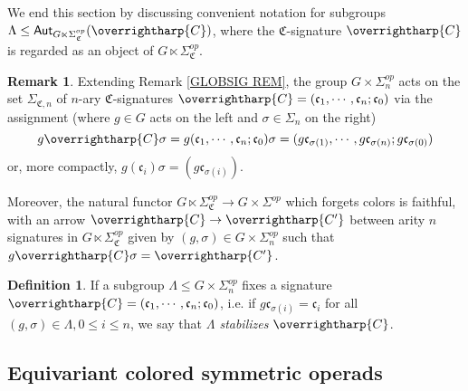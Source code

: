 \documentclass[a4paper,10pt
,draft
]{article}%
\numberwithin{equation}{section}
\numberwithin{figure}{section}
\theoremstyle{definition} %
\newtheorem{definition}[equation]{Definition}%
\newtheorem{remark}[equation]{Remark}%
\newcommand{\vect}[1]{\text{\overrightharp{\ensuremath{#1}}}}
\newcommand{\1}{\ensuremath{\mathbbm 1}}%
\begin{document}
We end this section by discussing convenient notation  
for subgroups 
$\Lambda \leq \mathsf{Aut}_{G \ltimes \Sigma_{\mathfrak{C}}^{op}}(\vect{C})$,
where the $\mathfrak{C}$-signature $\vect{C}$
is regarded as an object of 
$G \ltimes \Sigma_{\mathfrak{C}}^{op}$.



\begin{remark}\label{SIGACT REM}
	Extending Remark \ref{GLOBSIG REM}, 
	the group $G \times \Sigma_n^{op}$
	acts on the set $\Sigma_{\mathfrak{C},n}$
	of $n$-ary $\mathfrak{C}$-signatures
	$\vect{C} = (\mathfrak{c}_1,\cdots,\mathfrak{c}_n;\mathfrak{c}_0)$
	via the assignment (where $g \in G$ acts on the left and $\sigma \in \Sigma_n$ on the right)
	\begin{equation}\label{SIGACT_EQ}
	g \vect{C} \sigma =
	g (\mathfrak{c}_1,\cdots,\mathfrak{c}_n;\mathfrak{c}_0) \sigma
	=
	(g\mathfrak{c}_{\sigma(1)},\cdots,g\mathfrak{c}_{\sigma(n)};g\mathfrak{c}_{\sigma(0)})
	\end{equation}
	or, more compactly, $g (\mathfrak{c}_i) \sigma = (g \mathfrak{c}_{\sigma(i)})$.
	
	Moreover, the natural functor 
	$G \ltimes \Sigma^{op}_{\mathfrak{C}}
	\to G \times \Sigma^{op}$
	which forgets colors is faithful,
	with an arrow
	$\vect{C} \to \vect{C'}$
	between arity $n$ signatures
	in $G \ltimes \Sigma_{\mathfrak{C}}^{op}$
	given by 
	$(g,\sigma) \in G \times \Sigma_n^{op}$
	such that
	$g \vect{C} \sigma = \vect{C'}$.
\end{remark}







\begin{definition}\label{STABS DEF}
	If a subgroup $\Lambda \leq G \times \Sigma_n^{op}$
	fixes a signature 
	$\vect{C} = (\mathfrak{c}_1,\cdots,\mathfrak{c}_n;\mathfrak{c}_0)$,
	i.e. if
	$g\mathfrak{c}_{\sigma(i)} = \mathfrak{c}_i$
	for all $(g, \sigma) \in \Lambda, 0 \leq i \leq n$,
	we say that \textit{$\Lambda$ stabilizes $\vect C$}. 
\end{definition}








\subsection{Equivariant colored symmetric operads}
\label{EQCOSYMOP SEC}
\end{document}

